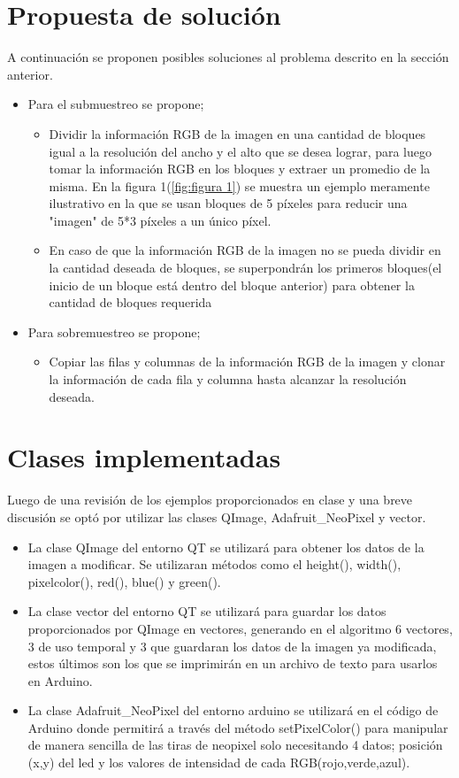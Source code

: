 \documentclass{article}
\begin{document}
	\section{Propuesta de solución} \label{contenido}
	A continuación se proponen posibles soluciones al problema descrito en la sección anterior.
	\begin{itemize}
		\item Para el submuestreo se propone;
		\begin{itemize}
			\item Dividir la información RGB de la imagen en una cantidad de bloques igual a la resolución del ancho y el alto que se desea lograr, para luego tomar la información RGB en los bloques y extraer un promedio de la misma. En la figura 1(\ref{fig:figura 1}) se muestra un ejemplo meramente ilustrativo en la que se usan bloques de 5 píxeles para reducir una "imagen" de 5*3 píxeles a un único píxel.
			\item En caso de que la información RGB de la imagen no se pueda dividir en la cantidad deseada de bloques, se superpondrán los primeros bloques(el inicio de un bloque está dentro del bloque anterior) para obtener la cantidad de bloques requerida
		\end{itemize}
		\item Para sobremuestreo se propone;
		\begin{itemize}
			\item Copiar las filas y columnas de la información RGB de la imagen y clonar la información de cada fila y columna hasta alcanzar la resolución deseada. 
		\end{itemize}
	\end{itemize}
	\section{Clases implementadas} \label{Clases}
	Luego de una revisión de los ejemplos proporcionados en clase y una breve discusión se optó por utilizar las clases QImage, Adafruit\_NeoPixel y vector.
	
	\begin{itemize}
	    \item La clase QImage del entorno QT se utilizará para obtener los datos de la imagen a modificar. Se utilizaran métodos como el height(), width(), pixelcolor(), red(), blue() y green().
	    \item La clase vector del entorno QT se utilizará para guardar los datos proporcionados por QImage en vectores, generando en el algoritmo 6 vectores, 3 de uso temporal y 3 que guardaran los datos de la imagen ya modificada, estos últimos son los que se imprimirán en un archivo de texto para usarlos en Arduino.
	    \item 	La clase Adafruit\_NeoPixel del entorno arduino se utilizará en el código de Arduino donde permitirá a través del método setPixelColor() para manipular de manera sencilla de las tiras de neopixel solo necesitando 4 datos; posición (x,y) del led y los valores de intensidad de cada RGB(rojo,verde,azul).
	\end{itemize}
	
\end{document}
